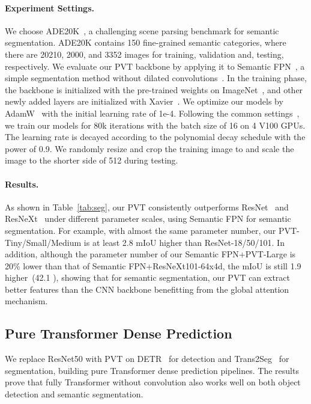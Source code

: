 \documentclass[10pt,twocolumn,letterpaper]{article}
\begin{document}
\paragraph{Experiment Settings.}
We choose ADE20K~\cite{zhou2017scene}, a challenging scene parsing benchmark for semantic segmentation. ADE20K contains 150 fine-grained semantic categories, where there are 20210, 2000, and 3352 images for training, validation and, testing, respectively. 
We evaluate our PVT backbone by applying it to Semantic FPN~\cite{kirillov2019panoptic}, a simple segmentation method without dilated convolutions~\cite{yu2015multi}.
In the training phase, the backbone is initialized with the pre-trained weights on ImageNet~\cite{deng2009imagenet}, and other newly added layers are initialized with Xavier~\cite{glorot2010understanding}. 
We optimize our models by AdamW~\cite{loshchilov2017decoupled} with the initial learning rate of 1e-4.
Following the common settings~\cite{kirillov2019panoptic,chen2017deeplab}, we train our models for 80k iterations with the batch size of 16 on 4 V100 GPUs.
The learning rate is decayed according to the polynomial decay schedule with the power of 0.9.
We randomly resize and crop the training image to  and scale the image to the shorter side of 512 during testing.


\paragraph{Results.} 
As shown in Table~\ref{tab:seg}, our PVT consistently outperforms ResNet~\cite{he2016deep} and ResNeXt~\cite{xie2017aggregated} under different parameter scales, using Semantic FPN for semantic segmentation. 
For example, with almost the same parameter number, our PVT-Tiny/Small/Medium is at least 2.8 mIoU higher than ResNet-18/50/101. 
In addition, although the parameter number of our Semantic FPN+PVT-Large is 20\% lower than that of Semantic FPN+ResNeXt101-64x4d, the mIoU is still 1.9 higher~(42.1 ), showing that for semantic segmentation, our PVT can extract better features than the CNN backbone benefitting from the global attention mechanism.


\subsection{Pure Transformer Dense Prediction}
We replace ResNet50 with PVT on DETR~\cite{carion2020end} for detection and Trans2Seg~\cite{xie2021segmenting} for segmentation, building pure Transformer dense prediction pipelines. The results prove that fully Transformer without convolution also works well on both object detection and semantic segmentation.
\end{document}

